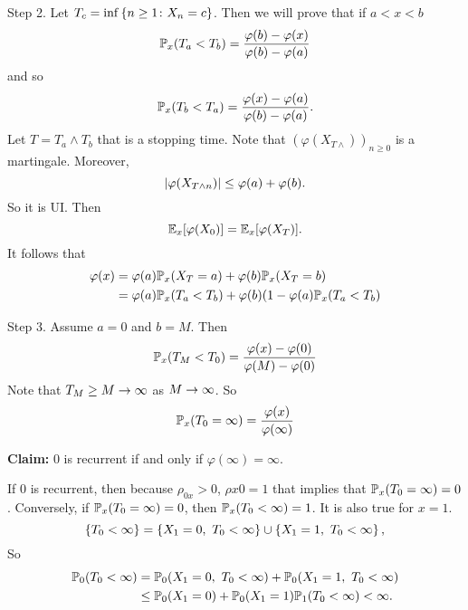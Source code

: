 \begin{exam}
    \noindent Step 2. Let $T_c = \inf \left\{n \geq 1 \colon X_n = c\right\}$. Then we will prove that if $a < x < b$
    \begin{equation*}
        \mathbb{P}_x(T_a < T_b) = \frac{\varphi(b) - \varphi(x)}{\varphi(b) - \varphi(a)}
    \end{equation*}
    and so
    \begin{equation*}
        \mathbb{P}_x(T_b < T_a) = \frac{\varphi(x) - \varphi(a)}{\varphi(b) - \varphi(a)}.
    \end{equation*}
    Let $T = T_a \wedge T_b$ that is a stopping time. Note that $(\varphi( X_{T \wedge}))_{n \geq 0}$ is a martingale. Moreover,
    \begin{equation*}
        \left\lvert\varphi(X_{T \wedge n})\right\lvert \leq \varphi(a) + \varphi(b).
    \end{equation*}
    So it is UI. Then
    \begin{equation*}
        \mathbb{E}_x[\varphi(X_0)] = \mathbb{E}_x[\varphi(X_T)].
    \end{equation*}
    It follows that
    \begin{equation*}
        \begin{aligned}
            \varphi(x) &= \varphi(a)\mathbb{P}_x(X_T = a) + \varphi(b)\mathbb{P}_x(X_T = b) \\
            &= \varphi(a)\mathbb{P}_x(T_a < T_b) + \varphi(b)(1 - \varphi(a)\mathbb{P}_x(T_a < T_b)
        \end{aligned}
    \end{equation*}

    \noindent Step 3. Assume $a = 0$ and $b = M$. Then
    \begin{equation*}
        \mathbb{P}_x(T_M < T_0) = \frac{\varphi(x) - \varphi(0)}{\varphi(M) - \varphi(0)}
    \end{equation*}
    Note that $T_M \geq M \rightarrow \infty$ as $M \rightarrow \infty$. So
    \begin{equation*}
        \mathbb{P}_x(T_0 = \infty) = \frac{\varphi(x)}{\varphi(\infty)}
    \end{equation*}
    
    \noindent \textbf{Claim:} $0$ is recurrent if and only if $\varphi(\infty) = \infty$.

    \noindent If $0$ is recurrent, then because $\rho_{0x} > 0$, $\rho{x0} = 1$ that implies that $\mathbb{P}_x(T_0 = \infty) = 0$. Conversely, if $\mathbb{P}_x(T_0 = \infty) = 0$, then $\mathbb{P}_x(T_0 < \infty) = 1$. It is also true for $x = 1$. 
    \begin{equation*}
        \left\{T_0 < \infty\right\} = \left\{X_1 = 0,~ T_0 < \infty\right\} \cup \left\{X_1 = 1,~ T_0 < \infty\right\},
    \end{equation*}
    So
    \begin{equation*}
        \begin{aligned}
            \mathbb{P}_0(T_0 < \infty) &= \mathbb{P}_0(X_1 = 0,~ T_0 < \infty)+ \mathbb{P}_0(X_1 = 1,~ T_0 < \infty) \\
            &\leq \mathbb{P}_0(X_1 = 0) + \mathbb{P}_0(X_1 = 1) \mathbb{P}_{1}(T_0 < \infty) < \infty.
        \end{aligned}
    \end{equation*}
\end{exam}

